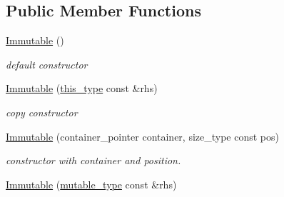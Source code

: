 \subsection*{Public Member Functions}
\begin{DoxyCompactItemize}
\item 
\hypertarget{classhryky_1_1iterator_1_1random_1_1_immutable_a2beb96e03bda518e125d7dba45cf0aaa}{\hyperlink{classhryky_1_1iterator_1_1random_1_1_immutable_a2beb96e03bda518e125d7dba45cf0aaa}{Immutable} ()}\label{classhryky_1_1iterator_1_1random_1_1_immutable_a2beb96e03bda518e125d7dba45cf0aaa}

\begin{DoxyCompactList}\small\item\em default constructor \end{DoxyCompactList}\item 
\hypertarget{classhryky_1_1iterator_1_1random_1_1_immutable_a7b0ce10cf94aeca0c9f47de9ddfc6a46}{\hyperlink{classhryky_1_1iterator_1_1random_1_1_immutable_a7b0ce10cf94aeca0c9f47de9ddfc6a46}{Immutable} (\hyperlink{classhryky_1_1iterator_1_1random_1_1_immutable}{this\-\_\-type} const \&rhs)}\label{classhryky_1_1iterator_1_1random_1_1_immutable_a7b0ce10cf94aeca0c9f47de9ddfc6a46}

\begin{DoxyCompactList}\small\item\em copy constructor \end{DoxyCompactList}\item 
\hypertarget{classhryky_1_1iterator_1_1random_1_1_immutable_a6143628ffb64b7782b4f4138ec846b74}{\hyperlink{classhryky_1_1iterator_1_1random_1_1_immutable_a6143628ffb64b7782b4f4138ec846b74}{Immutable} (container\-\_\-pointer container, size\-\_\-type const pos)}\label{classhryky_1_1iterator_1_1random_1_1_immutable_a6143628ffb64b7782b4f4138ec846b74}

\begin{DoxyCompactList}\small\item\em constructor with container and position. \end{DoxyCompactList}\item 
\hypertarget{classhryky_1_1iterator_1_1random_1_1_immutable_aa73e85ff6af376adf25ddae321cc1deb}{\hyperlink{classhryky_1_1iterator_1_1random_1_1_immutable_aa73e85ff6af376adf25ddae321cc1deb}{Immutable} (\hyperlink{classhryky_1_1iterator_1_1random_1_1_mutable}{mutable\-\_\-type} const \&rhs)}\label{classhryky_1_1iterator_1_1random_1_1_immutable_aa73e85ff6af376adf25ddae321cc1deb}


\end{DoxyCompactItemize}

